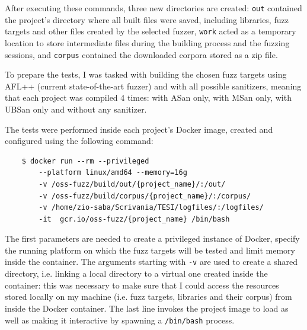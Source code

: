 After executing these commands, three new directories are created: \verb|out| contained the project's directory where all built files were saved, including libraries, fuzz targets and other files created by the selected fuzzer, \verb|work| acted as a temporary location to store intermediate files during the building process and the fuzzing sessions, and \verb|corpus| contained the downloaded corpora stored as a zip file.

To prepare the tests, I was tasked with building the chosen fuzz targets using AFL++ (current state-of-the-art fuzzer) and with all possible sanitizers, meaning that each project was compiled 4 times: with ASan only, with MSan only, with UBSan only and without any sanitizer.

The tests were performed inside each project's Docker image, created and configured using the following command:

\begin{verbatim}
    $ docker run --rm --privileged 
        --platform linux/amd64 --memory=16g 
        -v /oss-fuzz/build/out/{project_name}/:/out/
        -v /oss-fuzz/build/corpus/{project_name}/:/corpus/    
        -v /home/zio-saba/Scrivania/TESI/logfiles/:/logfiles/ 
        -it  gcr.io/oss-fuzz/{project_name} /bin/bash
\end{verbatim}
The first parameters are needed to create a privileged instance of Docker, specify the running platform on which the fuzz targets will be tested and limit memory inside the container. The arguments starting with \verb|-v| are used to create a shared directory, i.e. linking a local directory to a virtual one created inside the container: this was necessary to make sure that I could access the resources stored locally on my machine (i.e. fuzz targets, libraries and their corpus) from inside the Docker container. The last line invokes the project image to load as well as making it interactive by spawning a \verb|/bin/bash| process.
\ \\

